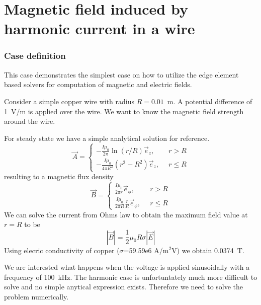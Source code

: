 \chapter{Magnetic field induced by harmonic current in a wire}



\subsection*{Case definition}

This case demonstrates the simplest case on how to utilize the edge element based solvers
for computation of magnetic and electric fields.

Consider a simple copper wire with radius $R=0.01$~m. A potential difference of 1~V/m is applied
over the wire. We want to know the magnetic field strength around the wire.  

For steady state we have a simple analytical solution for reference.
\begin{equation}
\vec{A} = \left \{
\begin{array}{ll}
  -\frac{I\mu_0}{2\pi}\ln (r/R) \vec{e}_z, & \, \, \, r > R \\
  -\frac{I\mu_0}{4\pi R^2 } (r^2 - R^2) \vec{e}_z, & \, \, \, r \leq R 
\end{array}  
\right .
\end{equation}
resulting to a magnetic flux density
\begin{equation}
\vec{B} = \left \{
\begin{array}{ll}
  \frac{I\mu_0}{2\pi r}\vec{e}_\phi, & \, \, \, r > R \\
  \frac{I\mu_0}{2\pi R}\frac{r}{R}\vec{e}_\phi, & \, \, \, r \leq R 
\end{array}  
\right .
\end{equation}
We can solve the current from Ohms law to obtain the maximum field value at $r=R$ to be
\begin{equation}
  | \vec{B} | = \frac{1}{2} \mu_0 R \sigma | \vec{E} |   
\end{equation}
Using elecric conductivity of copper ($\sigma$=59.59e6 A/m$^2$V) we obtain 0.0374~T.

We are interested what happens when the voltage is applied sinusoidally with a frequency of 100~kHz.
The harmonic case is unfortuntately much more difficult to solve and no simple anytical expression exists.
Therefore we need to solve the problem numerically. 


